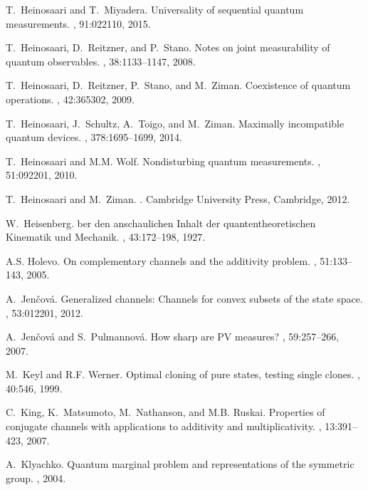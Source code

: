 \documentclass[12pt]{article}
\theoremstyle{definition}
\begin{document}
{\begin{thebibliography}{10}
T.~Heinosaari and T.~Miyadera.
\newblock Universality of sequential quantum measurements.
, 91:022110, 2015.

T.~Heinosaari, D.~Reitzner, and P.~Stano.
\newblock Notes on joint measurability of quantum observables.
, 38:1133--1147, 2008.

T.~Heinosaari, D.~Reitzner, P.~Stano, and M.~Ziman.
\newblock Coexistence of quantum operations.
, 42:365302, 2009.

T.~Heinosaari, J.~Schultz, A.~Toigo, and M.~Ziman.
\newblock Maximally incompatible quantum devices.
, 378:1695--1699, 2014.

T.~Heinosaari and M.M. Wolf.
\newblock Nondisturbing quantum measurements.
, 51:092201, 2010.

T.~Heinosaari and M.~Ziman.
.
\newblock Cambridge University Press, Cambridge, 2012.

W.~Heisenberg.
ber den anschaulichen {I}nhalt der quantentheoretischen
  {K}inematik und {M}echanik.
, 43:172--198, 1927.

A.S. Holevo.
\newblock On complementary channels and the additivity problem.
, 51:133--143, 2005.

A.~Jen{\v{c}}ov\'a.
\newblock Generalized channels: {C}hannels for convex subsets of the state
  space.
, 53:012201, 2012.

A.~Jen\v{c}ov{\'a} and S.~Pulmannov{\'a}.
\newblock How sharp are {PV} measures?
, 59:257--266, 2007.

M.~Keyl and R.F. Werner.
\newblock Optimal cloning of pure states, testing single clones.
, 40:546, 1999.

C.~King, K.~Matsumoto, M.~Nathanson, and M.B. Ruskai.
\newblock Properties of conjugate channels with applications to additivity and
  multiplicativity.
, 13:391--423, 2007.

A.~Klyachko.
\newblock Quantum marginal problem and representations of the symmetric group.
, 2004.


\end{thebibliography}}
\end{document}
